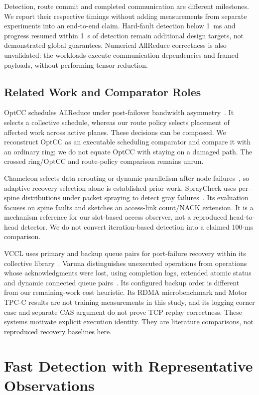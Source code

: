 \documentclass[sigconf]{acmart}
\begin{document}
Detection, route commit and completed communication are different milestones.
We report their respective timings without adding measurements from separate
experiments into an end-to-end claim. Hard-fault detection below 1~ms and
progress resumed within 1~s of detection remain additional design targets,
not demonstrated global guarantees. Numerical AllReduce correctness is also
unvalidated: the workloads execute communication dependencies and framed
payloads, without performing tensor reduction.

\subsection{Related Work and Comparator Roles}
OptCC schedules AllReduce under post-failover bandwidth
asymmetry~\cite{optcc2026}. It selects a collective schedule, whereas our
route policy selects placement of affected work across active planes. These
decisions can be composed. We reconstruct OptCC as an executable scheduling
comparator and compare it with an ordinary ring; we do not equate OptCC
with staying on a damaged path. The crossed ring/OptCC and route-policy
comparison remains unrun.

Chameleon selects data rerouting or dynamic parallelism after node
failures~\cite{chameleon2026}, so adaptive recovery selection alone is
established prior work. SprayCheck uses per-spine distributions under packet
spraying to detect gray failures~\cite{spraycheck2026}. Its evaluation focuses
on spine faults and sketches an access-link count/NACK extension. It is a
mechanism reference for our slot-based access observer, not a reproduced
head-to-head detector. We do not convert iteration-based detection into
a claimed 100-ms comparison.

VCCL uses primary and backup queue pairs for port-failure recovery within
its collective library~\cite{vccl2026}. Varuna distinguishes unexecuted
operations from operations whose acknowledgments were lost, using completion
logs, extended atomic status and dynamic connected queue
pairs~\cite{varuna2026}. Its configured backup order is different from
our remaining-work cost heuristic. Its RDMA microbenchmark and Motor
TPC-C results are not training measurements in this study, and its logging
corner case and separate CAS argument do not prove TCP replay correctness.
These systems motivate explicit execution identity. They are literature
comparisons, not reproduced recovery baselines here.

\section{Fast Detection with Representative Observations}
\label{sec:detection}
\end{document}
